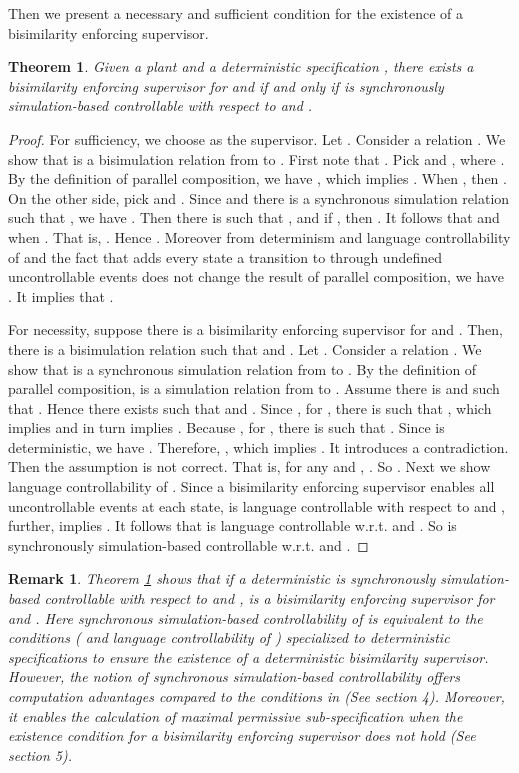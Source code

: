 \documentclass[preprint,authoryear,12pt]{elsarticle}
\newtheorem{Theorem}{Theorem}
\newtheorem{Remark}{Remark}
\begin{document}
Then we present a necessary and sufficient condition for the
existence of a bisimilarity enforcing supervisor.

\begin{Theorem}\label{t}
Given a plant  and a deterministic specification , there
exists a bisimilarity enforcing supervisor  for  and  if
and only if  is synchronously simulation-based controllable
with respect to  and .
\end{Theorem}

\begin{proof}
For sufficiency, we choose  as the supervisor. Let
 .
Consider a relation . We show that  is a
bisimulation relation from  to . First note that . Pick  and , where .
By the definition of parallel composition, we have , which implies .
When , then . On the other
side, pick  and . Since  and there is a synchronous
simulation relation  such that , we
have . Then there is 
such that , and if , then . It follows that 
and  when . That is, . Hence . Moreover from determinism and language
controllability of  and the fact that  adds every state
a transition to  through undefined uncontrollable events does
not change the result of parallel composition, we have
. It implies that .

For necessity, suppose there is a bisimilarity enforcing
supervisor  for  and . Then, there is a bisimulation
relation  such that  and . Let . Consider a relation
. We show that  is a synchronous simulation
relation from  to . By the definition of parallel
composition,  is a simulation relation from  to .
Assume there is  and  such that . Hence there exists  such
that  and . Since , for , there is  such that , which implies  and in turn implies
. Because , for , there is  such that . Since  is deterministic, we have .
Therefore, , which implies . It introduces a contradiction. Then the assumption is not
correct. That is, for any  and , . So . Next we show language
controllability of . Since a bisimilarity enforcing
supervisor  enables all uncontrollable events at each state,
 is language controllable with respect to  and
, further,  implies . It
follows that  is language controllable w.r.t.  and
. So  is synchronously simulation-based
controllable w.r.t.  and .
\end{proof}


\begin{Remark}
Theorem \ref{t} shows that if a deterministic  is synchronously
simulation-based controllable with respect to  and
,  is a bisimilarity enforcing supervisor for
 and . Here synchronous simulation-based controllability of
 is equivalent to the conditions ( and
language controllability of ) specialized to deterministic
specifications \citep{zhoubisimilarity2011} to ensure the
existence of a deterministic bisimilarity supervisor. However, the
notion of synchronous simulation-based controllability offers
computation advantages compared to the conditions in
\citep{zhoubisimilarity2011} (See section 4). Moreover, it enables
the calculation of maximal permissive sub-specification when the
existence condition for a bisimilarity enforcing supervisor does
not hold (See section 5).
\end{Remark}
\end{document}
